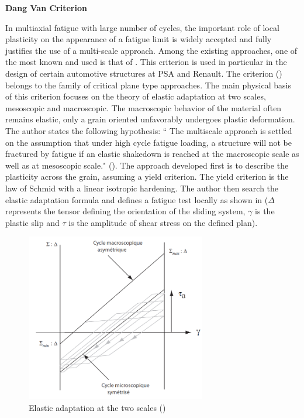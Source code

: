 \vspace{6pt}
\textbf{Dang Van Criterion}
\vspace{6pt}

In multiaxial fatigue with large number of cycles, the important role of local plasticity on the appearance of a fatigue limit is widely accepted and fully justifies the use of a multi-scale approach. Among the existing approaches, one of the most known and used is that of \cite{Van1999}. This criterion is used in particular in the design of certain automotive structures at PSA and
Renault. The criterion (\cite{van1986criterion}) belongs to the family of critical plane type approaches. The main physical
basis of this criterion focuses on the theory of elastic adaptation at two scales, mesoscopic and macroscopic. The macroscopic behavior of the material often remains elastic, only a grain oriented unfavorably undergoes
plastic deformation. The author states the following hypothesis: `` The
multiscale approach is settled on the assumption that under high cycle fatigue loading, a structure
will not be fractured by fatigue if an elastic shakedown is reached at the macroscopic scale as well
as at mesoscopic scale." (\cite{Van1999}). The approach developed first is
to describe the plasticity across the grain, assuming a yield criterion. The yield criterion is the law of Schmid with a
linear isotropic hardening. The author then search the elastic adaptation formula and defines a fatigue
test locally as shown in  ($\Delta$ represents the tensor defining the orientation of the sliding system, $\gamma$ is the plastic slip  and $\tau$
is the amplitude of shear stress on the defined plan).
\begin{figure}[!h]
	\centering
	\includegraphics[width=0.7\textwidth]{figures//DV.png} 
	\caption{Elastic adaptation at the two scales (\cite{Van1999})}
	\label{figDV}
\end{figure}
